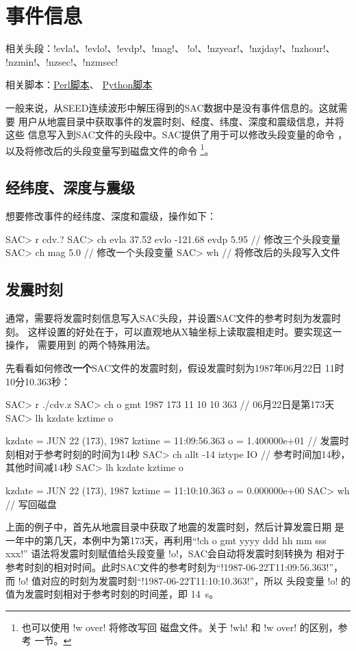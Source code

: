 \section{事件信息}
\label{sec:event-info}
相关头段：!evla!、!evlo!、!evdp!、!mag!、
    !o!、!nzyear!、!nzjday!、!nzhour!、
    !nzmin!、!nzsec!、!nzmsec!

相关脚本：\hyperref[subsec:event-info-perl]{Perl脚本}、
          \hyperref[subsec:event-info-python]{Python脚本}

一般来说，从SEED连续波形中解压得到的SAC数据中是没有事件信息的。这就需要
用户从地震目录中获取事件的发震时刻、经度、纬度、深度和震级信息，并将这些
信息写入到SAC文件的头段中。SAC提供了用于可以修改头段变量的命令
，以及将修改后的头段变量写到磁盘文件的命令
\footnote{也可以使用 !w over! 将修改写回
磁盘文件。关于 !wh! 和 !w over! 的区别，参考
 一节。}。

\subsection{经纬度、深度与震级}
想要修改事件的经纬度、深度和震级，操作如下：
\begin{SACCode}
SAC> r cdv.?
SAC> ch evla 37.52 evlo -121.68 evdp 5.95   // 修改三个头段变量
SAC> ch mag 5.0                             // 修改一个头段变量
SAC> wh                                     // 将修改后的头段写入文件
\end{SACCode}

\subsection{发震时刻}
通常，需要将发震时刻信息写入SAC头段，并设置SAC文件的参考时刻为发震时刻。
这样设置的好处在于，可以直观地从X轴坐标上读取震相走时。要实现这一操作，
需要用到  的两个特殊用法。

先看看如何修改\textbf{一个}SAC文件的发震时刻，假设发震时刻为1987年06月22日
11时10分10.363秒：
\label{code:origin-time}
\begin{SACCode}
SAC> r ./cdv.z
SAC> ch o gmt 1987 173 11 10 10 363   // 06月22日是第173天
SAC> lh kzdate kztime o

     kzdate = JUN 22 (173), 1987
     kztime = 11:09:56.363
          o = 1.400000e+01       // 发震时刻相对于参考时刻的时间为14秒
SAC> ch allt -14 iztype IO       // 参考时间加14秒，其他时间减14秒
SAC> lh kzdate kztime o

     kzdate = JUN 22 (173), 1987
     kztime = 11:10:10.363
          o = 0.000000e+00
SAC> wh                          // 写回磁盘
\end{SACCode}
上面的例子中，首先从地震目录中获取了地震的发震时刻，然后计算发震日期
是一年中的第几天，本例中为第173天，再利用``!ch o gmt yyyy ddd hh mm sss xxx!''
语法将发震时刻赋值给头段变量 !o!，SAC会自动将发震时刻转换为
相对于参考时刻的相对时间。此时SAC文件的参考时刻为``!1987-06-22T11:09:56.363!''，
而 !o! 值对应的时刻为发震时刻``!1987-06-22T11:10:10.363!''，所以
头段变量 !o! 的值为发震时刻相对于参考时刻的时间差，即 \SI{14}{\s}。

